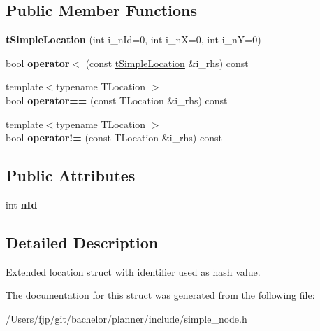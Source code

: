 \subsection*{Public Member Functions}
\begin{DoxyCompactItemize}
\item 
\mbox{\label{structplanner_1_1t_simple_location_a5d8f6cbf74298ad6e80ac04f8155ece2}} 
{\bfseries t\+Simple\+Location} (int i\+\_\+n\+Id=0, int i\+\_\+nX=0, int i\+\_\+nY=0)
\item 
\mbox{\label{structplanner_1_1t_simple_location_afa78b07e810b294b1cfd1a81379a92d3}} 
bool {\bfseries operator$<$} (const \mbox{\hyperlink{structplanner_1_1t_simple_location}{t\+Simple\+Location}} \&i\+\_\+rhs) const
\item 
\mbox{\label{structplanner_1_1t_simple_location_a1231d9a6478b58ed3f4c272067e67416}} 
{\footnotesize template$<$typename T\+Location $>$ }\\bool {\bfseries operator==} (const T\+Location \&i\+\_\+rhs) const
\item 
\mbox{\label{structplanner_1_1t_simple_location_a76cc36fbdc32b448900cf5353e139dea}} 
{\footnotesize template$<$typename T\+Location $>$ }\\bool {\bfseries operator!=} (const T\+Location \&i\+\_\+rhs) const
\end{DoxyCompactItemize}
\subsection*{Public Attributes}
\begin{DoxyCompactItemize}
\item 
\mbox{\label{structplanner_1_1t_simple_location_aa587a447cbe2af93dce4dedd14ac0b1c}} 
int {\bfseries n\+Id}
\end{DoxyCompactItemize}


\subsection{Detailed Description}
Extended location struct with identifier used as hash value. 

The documentation for this struct was generated from the following file\+:\begin{DoxyCompactItemize}
\item 
/\+Users/fjp/git/bachelor/planner/include/simple\+\_\+node.\+h\end{DoxyCompactItemize}
